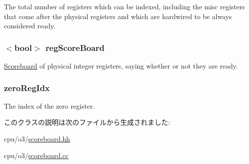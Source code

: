 \label{classScoreboard_afa56b73206d6c8a0f68cc31143205f9e}
The total number of registers which can be indexed, including the misc registers that come after the physical registers and which are hardwired to be always considered ready. \hypertarget{classScoreboard_a1bbf9bd6403e6be95f85ee26ebb06ca7}{
\subsubsection[{regScoreBoard}]{$<$bool$>$ {\bf regScoreBoard}}}
\label{classScoreboard_a1bbf9bd6403e6be95f85ee26ebb06ca7}
\hyperlink{classScoreboard}{Scoreboard} of physical integer registers, saying whether or not they are ready. \hypertarget{classScoreboard_ad816cc199dde22b6242ff4a143f5cc19}{
\subsubsection[{zeroRegIdx}]{ {\bf zeroRegIdx}}}
\label{classScoreboard_ad816cc199dde22b6242ff4a143f5cc19}
The index of the zero register. 

このクラスの説明は次のファイルから生成されました:\begin{DoxyCompactItemize}
\item 
cpu/o3/\hyperlink{scoreboard_8hh}{scoreboard.hh}\item 
cpu/o3/\hyperlink{scoreboard_8cc}{scoreboard.cc}\end{DoxyCompactItemize}
